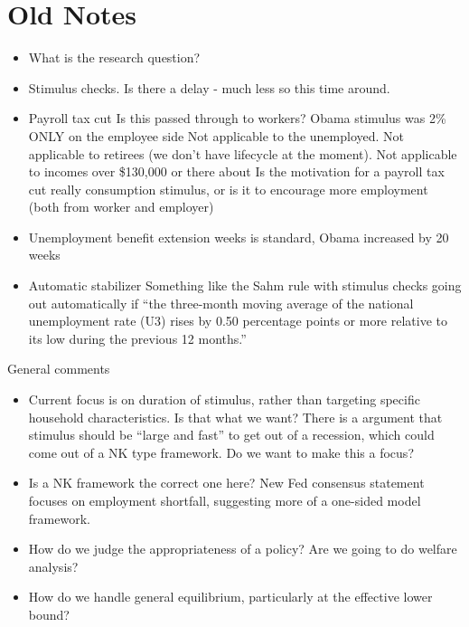 \documentclass[]{article}
\begin{document}
\newpage
\newpage
\section{Old Notes}
\begin{itemize}
	\item What is the research question?
	\item Stimulus checks. Is there a delay - much less so this time around.
	\item Payroll tax cut
	\subitem Is this passed through to workers? Obama stimulus was 2\% ONLY on the employee side
	\subitem Not applicable to the unemployed. 
	\subitem Not applicable to retirees (we don't have lifecycle at the moment).
	\subitem Not applicable to incomes over \$130,000 or there about
	\subitem Is the motivation for a payroll tax cut really consumption stimulus, or is it to encourage more employment (both from worker and employer)
	\item Unemployment benefit extension
	 weeks is standard, Obama increased by 20 weeks
	\item Automatic stabilizer
	\subitem Something like the Sahm rule with stimulus checks going out automatically if ``the three-month moving average of the national unemployment rate (U3) rises by 0.50 percentage points or more relative to its low during the previous 12 months.''
\end{itemize}

General comments
\begin{itemize}
	\item Current focus is on duration of stimulus, rather than targeting specific household characteristics. Is that what we want? There is a argument that stimulus should be ``large and fast'' to get out of a recession, which could come out of a NK type framework. Do we want to make this a focus?
	\item Is a NK framework the correct one here? New Fed consensus statement focuses on employment shortfall, suggesting more of a one-sided model framework.
	\item How do we judge the appropriateness of a policy? Are we going to do welfare analysis?
	\item How do we handle general equilibrium, particularly at the effective lower bound?
\end{itemize}
\end{document}
